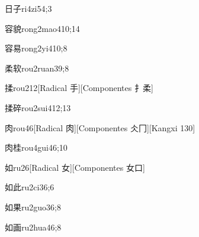 \begin{verbete}{日子}{ri4zi5}{4;3}
\end{verbete}

\begin{verbete}{容貌}{rong2mao4}{10;14}
\end{verbete}

\begin{verbete}{容易}{rong2yi4}{10;8}
\end{verbete}

\begin{verbete}{柔软}{rou2ruan3}{9;8}
\end{verbete}

\begin{verbete}{揉}{rou2}{12}[Radical 手][Componentes 扌柔]
\end{verbete}

\begin{verbete}{揉碎}{rou2sui4}{12;13}
\end{verbete}

\begin{verbete}{肉}{rou4}{6}[Radical 肉][Componentes 仌冂][Kangxi 130]
\end{verbete}

\begin{verbete}{肉桂}{rou4gui4}{6;10}
\end{verbete}

\begin{verbete}{如}{ru2}{6}[Radical 女][Componentes 女口]
\end{verbete}

\begin{verbete}{如此}{ru2ci3}{6;6}
\end{verbete}

\begin{verbete}{如果}{ru2guo3}{6;8}
\end{verbete}

\begin{verbete}{如画}{ru2hua4}{6;8}
\end{verbete}

